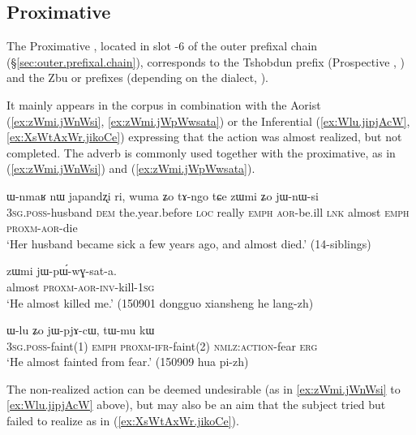 \subsection{Proximative} \label{sec:proximative}
The Proximative , located in slot -6 of the outer prefixal chain (§\ref{sec:outer.prefixal.chain}), corresponds to the Tshobdun  prefix (Prospective , \citealt[142–143]{sun08shiti}) and the Zbu  or  prefixes (depending on the dialect, \citealt[9;201-202]{gong18these}).

It mainly appears in the corpus in combination with the Aorist (\ref{ex:zWmi.jWnWsi}, \ref{ex:zWmi.jWpWwsata}) or the Inferential (\ref{ex:Wlu.jipjAcW}, \ref{ex:XsWtAxWr.jikoCe}) expressing that the action was almost realized, but not completed. The adverb  is commonly used together with the proximative, as in (\ref{ex:zWmi.jWnWsi}) and (\ref{ex:zWmi.jWpWwsata}).
\largerpage
\begin{exe}
\ex \label{ex:zWmi.jWnWsi}
\gll ɯ-nmaʁ nɯ japandʐi ri, wuma ʑo tɤ-ngo tɕe zɯmi ʑo jɯ-nɯ-si \\
\textsc{3sg}.\textsc{poss}-husband \textsc{dem} the.year.before \textsc{loc} really \textsc{emph} \textsc{aor}-be.ill \textsc{lnk} almost \textsc{emph}  \textsc{proxm}-\textsc{aor}-die \\
\glt `Her husband became sick a few years ago, and almost died.' (14-siblings)
  \end{exe}
  
  \begin{exe}
\ex \label{ex:zWmi.jWpWwsata}
\gll zɯmi jɯ-pɯ́-wɣ-sat-a. \\
almost \textsc{proxm}-\textsc{aor}-\textsc{inv}-kill-\textsc{1sg} \\
\glt `He almost killed me.' (150901 dongguo xiansheng he lang-zh) 
 \end{exe} 
 
\begin{exe}
\ex \label{ex:Wlu.jipjAcW}
\gll ɯ-lu ʑo jɯ-pjɤ-cɯ, tɯ-mu kɯ \\
\textsc{3sg}.\textsc{poss}-faint(1) \textsc{emph} \textsc{proxm}-\textsc{ifr}-faint(2) \textsc{nmlz}:\textsc{action}-fear \textsc{erg} \\
\glt `He almost fainted from fear.' (150909 hua pi-zh) 
\end{exe}

The non-realized action can be deemed undesirable (as in \ref{ex:zWmi.jWnWsi} to \ref{ex:Wlu.jipjAcW} above), but may also be an aim that the subject tried but failed to realize as in (\ref{ex:XsWtAxWr.jikoCe}).


